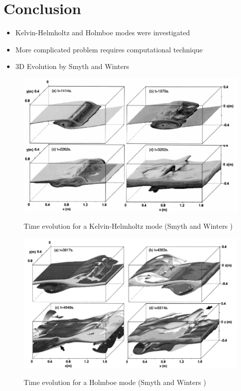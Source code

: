 \section{Conclusion}
\begin{itemize}
  \item Kelvin-Helmholtz and Holmboe modes were investigated
  \item More complicated problem requires computational technique
  \item 3D Evolution by Smyth and Winters \cite{Smyth}
\end{itemize}
\begin{figure}[htpb]
  \centering
  \includegraphics[width=0.9\textheight]{kh3.png}\\
  \caption{Time evolution for a Kelvin-Helmholtz mode (Smyth and Winters \cite{Smyth})}\label{kh3}
\end{figure}
\begin{figure}[htpb]
  \centering
  \includegraphics[width=0.9\textheight]{ho5.png}\\
  \caption{Time evolution for a Holmboe mode (Smyth and Winters \cite{Smyth})}\label{ho5}
\end{figure}
